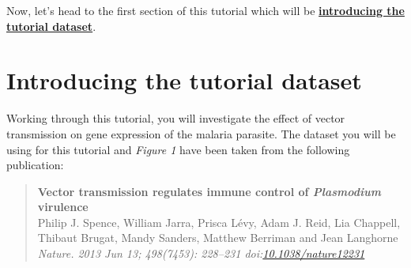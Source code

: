 \documentclass[11pt]{article}
\begin{document}
    Now, let's head to the first section of this tutorial which will be
\textbf{\href{dataset-intro.ipynb}{introducing the tutorial dataset}}.





\newpage





    \hypertarget{introducing-the-tutorial-dataset}{%
\section{Introducing the tutorial
dataset}\label{introducing-the-tutorial-dataset}}

    Working through this tutorial, you will investigate the effect of vector
transmission on gene expression of the malaria parasite. The dataset you
will be using for this tutorial and \textit{Figure 1} have been taken from
the following publication:

    \begin{quote}
\textbf{Vector transmission regulates immune control of
\textit{Plasmodium} virulence}\\
Philip J. Spence, William Jarra, Prisca Lévy, Adam J. Reid, Lia
Chappell, Thibaut Brugat, Mandy Sanders, Matthew Berriman and Jean
Langhorne\\
\textit{Nature. 2013 Jun 13; 498(7453): 228--231
doi:\href{https://www.nature.com/articles/nature12231}{10.1038/nature12231}}
\end{quote}
\end{document}

